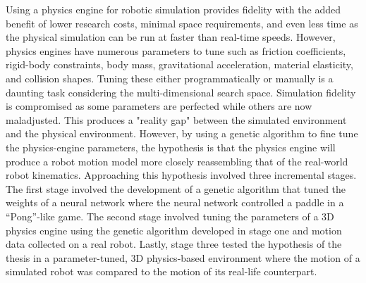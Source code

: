 \documentclass{book}[11pt]
\begin{document}
Using a physics engine for robotic simulation provides fidelity with the added benefit of lower research costs, minimal space requirements, and even less time as the physical simulation can be run at faster than real-time speeds. However, physics engines have numerous parameters to tune such as friction coefficients, rigid-body constraints, body mass, gravitational acceleration, material elasticity, and collision shapes. Tuning these either programmatically or manually is a daunting task considering the multi-dimensional search space. Simulation fidelity is compromised as some parameters are perfected while others are now maladjusted. This produces a "reality gap" between the simulated environment and the physical environment. However, by using a genetic algorithm to fine tune the physics-engine parameters, the hypothesis is that the physics engine will produce a robot motion model more closely reassembling that of the real-world robot kinematics. Approaching this hypothesis involved three incremental stages. The first stage involved the development of a genetic algorithm that tuned the weights of a neural network where the neural network controlled a paddle in a ``Pong''-like game. The second stage involved tuning the parameters of a 3D physics engine using the genetic algorithm developed in stage one and motion data collected on a real robot. Lastly, stage three tested the hypothesis of the thesis in a parameter-tuned, 3D physics-based environment where the motion of a simulated robot was compared to the motion of its real-life counterpart.
  

  \tableofcontents
  

  \listoffigures
  

  \listoftables

  \newpage
  \newpage
  \pagestyle{plain}
  \def\baselinestretch{1.9}
  \normalsize
  
\end{document}
